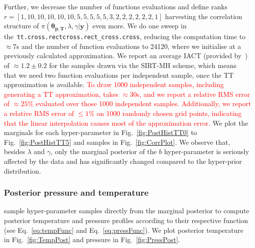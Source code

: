 Further, we decrease the number of functions evaluations and define ranks \linebreak$r = [ 1,  10,  10, 10, 10, 10, 5, 5, 5, 5, 5, 3, 2, 2, 2, 2, 2, 2, 1]$ harvesting the correlation structure of $\pi(\bm{\theta}_{\bm{p}, \bm{T}},\lambda,\gamma  | \bm{y})$ even more.
We do one sweep in \linebreak the~\texttt{tt.cross.rectcross.rect\_cross.cross}, reducing the computation time to $\approx 7$s and the number of function evaluations to 24120, where we initialise at a previously calculated approximation.
We report an average IACT (provided by~\cite{wolff2004monte, drikHesse}) of $\approx 1.2 \pm 0.2$ for the samples drawn via the SIRT-MH scheme, which means that we need two function evaluations per independent sample, once the TT approximation is available.
\textcolor{red}{To draw 1000 independent samples, including generating a TT approximation, takes $\approx30$s, and we report a relative RMS error of $\approx 25 \%$ evaluated over those 1000 independent samples.
	Additionally, we report a relative RMS error of $\leq 1\%$ on 1000 randomly chosen grid points, indicating that the linear interpolation causes most of the approximation error.}
We plot the marginals for each hyper-parameter in Fig.~\ref{fig:PostHistTT0} to Fig.~\ref{fig:PostHistTT5} and samples in Fig.~\ref{fig:CorrPlot}.
We observe that, besides $\lambda$ and $\gamma$, only the marginal posterior of the $b$ hyper-parameter is seriously affected by the data and has significantly changed compared to the hyper-prior distribution.
\clearpage
\subsubsection{Posterior pressure and temperature}
sample hyper-parameter samples directly from the marginal posterior to compute posterior temperature and pressure profiles according to their respective function (see Eq.~\ref{eq:tempFunc} and Eq.~\ref{eq:pressFunc}). 
We plot posterior temperature in Fig.~\ref{fig:TempPost} and pressure in Fig.~\ref{fig:PressPost}.

